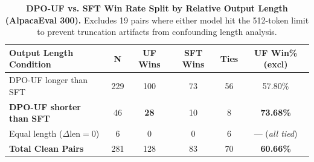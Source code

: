 \begin{table}[t]
\centering
\small
\caption{\textbf{DPO-UF vs. SFT Win Rate Split by Relative Output Length (AlpacaEval 300).} Excludes 19 pairs where either model hit the 512-token limit to prevent truncation artifacts from confounding length analysis.}
\label{tab:length_split}
\begin{tabularx}{\columnwidth}{Xccccc}
\toprule
\textbf{Output Length Condition} & \textbf{N} & \textbf{UF Wins} & \textbf{SFT Wins} & \textbf{Ties} & \textbf{UF Win\% (excl)} \\
\midrule
DPO-UF longer than SFT & 229 & 100 & 73 & 56 & 57.80\% \\
\textbf{DPO-UF shorter than SFT} & 46 & \textbf{28} & 10 & 8 & \textbf{73.68\%} \\
Equal length ($\Delta \text{len} = 0$) & 6 & 0 & 0 & 6 & --- (\textit{all tied}) \\
\midrule
\textbf{Total Clean Pairs} & 281 & 128 & 83 & 70 & \textbf{60.66\%} \\
\bottomrule
\end{tabularx}
\end{table}